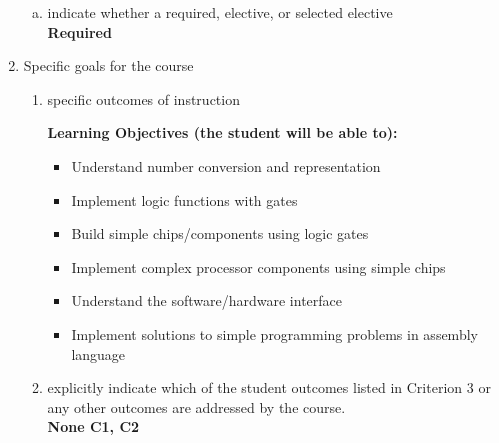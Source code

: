 \begin{enumerate}[1.]
\begin{enumerate}[a.]
\item indicate whether a required, elective, or selected elective\\ %
  {\bfseries
    Required
  }

\end{enumerate}

\item Specific goals for the course
\begin{enumerate}
\item specific outcomes of instruction\\ %
  {\bfseries
    Learning Objectives (the student will be able to):
    \begin{itemize}
      \item Understand number conversion and representation
      \item Implement logic functions with gates
      \item Build simple chips/components using logic gates
      \item Implement complex processor components using simple chips
      \item Understand the software/hardware interface
      \item Implement solutions to simple programming problems in assembly language
    \end{itemize}
  }

\item explicitly indicate which of the student outcomes listed in Criterion 3 or any other outcomes are addressed by the course.\\
  {\bfseries
    None
    C1,
    C2
  }
\end{enumerate}


\end{enumerate}

